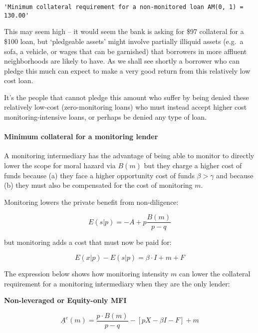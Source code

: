\documentclass[11pt]{article}
\makeatletter
\newcommand{\boxspacing}{\kern\kvtcb@left@rule\kern\kvtcb@boxsep}
\newcommand{\prompt}[4]{
        {\ttfamily\llap{{\color{#2}[#3]:\hspace{3pt}#4}}\vspace{-\baselineskip}}
    }
\makeatother
\begin{document}
            \begin{tcolorbox}[breakable, size=fbox, boxrule=.5pt, pad at break*=1mm, opacityfill=0]
\prompt{Out}{outcolor}{4}{\boxspacing}
\begin{Verbatim}[commandchars=\\\{\}]
'Minimum collateral requirement for a non-monitored loan AM(0, 1) = 130.00'
\end{Verbatim}
\end{tcolorbox}
        
    This may seem high -- it would seem the bank is asking for \$97
collateral for a \$100 loan, but `pledgeable assets' might involve
partially illiquid assets (e.g.~a sofa, a vehicle, or wages that can be
garnished) that borrowers in more affluent neighborhoods are likely to
have. As we shall see shortly a borrower who can pledge this much can
expect to make a very good return from this relatively low cost loan.

It's the people that cannot pledge this amount who suffer by being
denied these relatively low-cost (zero-monitoring loans) who must
instead accept higher cost monitoring-intensive loans, or perhaps be
denied any type of loan.

    \paragraph{Minimum collateral for a monitoring
lender}\label{minimum-collateral-for-a-monitoring-lender}

A monitoring intermediary has the advantage of being able to monitor to
directly lower the scope for moral hazard via \(B(m)\) but they charge a
higher cost of funds because (a) they face a higher opportunity cost of
funds \(\beta > \gamma\) and because (b) they must also be compensated
for the cost of monitoring \(m\).

Monitoring lowers the private benefit from non-diligence:

\[E(s|p)= -A + p\frac{B(m)}{p-q}\]

but monitoring adds a cost that must now be paid for:

\[E(x|p) - E(s|p) = \beta \cdot I + m + F\]

The expression below shows how monitoring intensity \(m\) can lower the
collateral requirement for a monitoring intermediary when they are the
only lender:

    \textbf{Non-leveraged or Equity-only MFI}

\[
\underline A^e(m) = \frac{p \cdot B(m)}{p-q} - \left[ {pX - \beta I - F} \right]  + m 
\]
\end{document}
